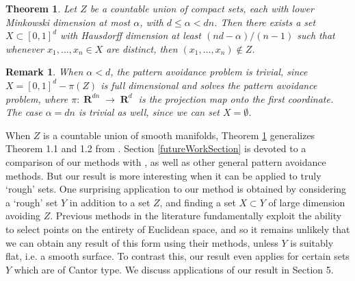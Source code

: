 \documentclass[dvipsnames,letterpaper,12pt]{article}
\numberwithin{equation}{section}
\theoremstyle{plain}
\newtheorem{theorem}{Theorem}
\newtheorem*{remark}{Remark}
\DeclareMathOperator{\RR}{\mathbf{R}}
\begin{document}
\begin{theorem}\label{mainTheorem}
	Let $Z$ be a countable union of compact sets, each with lower Minkowski dimension at most $\alpha$, with $d \leq \alpha < dn$. Then there exists a set $X \subset [0,1]^d$ with Hausdorff dimension at least $(nd - \alpha)/(n-1)$ such that whenever $x_1, \dots, x_n \in X$ are distinct, then $(x_1, \dots, x_n) \not \in Z$.
\end{theorem}

\begin{remark}
	When $\alpha < d$, the pattern avoidance problem is trivial, since $X = [0,1]^d - \pi(Z)$ is full dimensional and solves the pattern avoidance problem, where $\pi \colon \RR^{dn} \to \RR^d$ is the projection map onto the first coordinate. The case $\alpha = dn$ is trivial as well, since we can set $X = \emptyset$.

\end{remark}


When $Z$ is a countable union of smooth manifolds, Theorem \ref{mainTheorem} generalizes Theorem 1.1 and 1.2 from \cite{MalabikaRob}. Section \ref{futureWorkSection} is devoted to a comparison of our methods with \cite{MalabikaRob}, as well as other general pattern avoidance methods. But our result is more interesting when it can be applied to truly `rough' sets. One surprising application to our method is obtained by considering a `rough' set $Y$ in addition to a set $Z$, and finding a set $X \subset Y$ of large dimension avoiding $Z$. Previous methods in the literature fundamentally exploit the ability to select points on the entirety of Euclidean space, and so it remains unlikely that we can obtain any result of this form using their methods, unless $Y$ is suitably flat, i.e. a smooth surface. To contrast this, our result even applies for certain sets $Y$ which are of Cantor type. We discuss applications of our result in Section 5.

\end{document}
